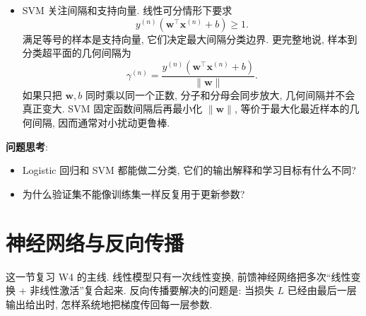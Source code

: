 \documentclass{../nndlcourse}
\begin{document}
\begin{enumerate}
\begin{itemize}
        因而更新会把该样本朝正确一侧推.
        \item SVM 关注间隔和支持向量. 线性可分情形下要求
        \[
            y^{(n)}\left(\boldsymbol{w}^{\top}\boldsymbol{x}^{(n)}+b\right)\ge 1.
        \]
        满足等号的样本是支持向量, 它们决定最大间隔分类边界.
        更完整地说, 样本到分类超平面的几何间隔为
        \[
            \gamma^{(n)}
            =
            \frac{y^{(n)}\left(\boldsymbol{w}^{\top}\boldsymbol{x}^{(n)}+b\right)}
            {\|\boldsymbol{w}\|}.
        \]
        如果只把 $\boldsymbol{w},b$ 同时乘以同一个正数, 分子和分母会同步放大, 几何间隔并不会真正变大. SVM 固定函数间隔后再最小化 $\|\boldsymbol{w}\|$, 等价于最大化最近样本的几何间隔, 因而通常对小扰动更鲁棒.
    \end{itemize}
\end{enumerate}

\textbf{问题思考}:
\begin{itemize}
    \item Logistic 回归和 SVM 都能做二分类, 它们的输出解释和学习目标有什么不同?
    \item 为什么验证集不能像训练集一样反复用于更新参数?
\end{itemize}

\section{神经网络与反向传播}

这一节复习 W4 的主线. 线性模型只有一次线性变换, 前馈神经网络把多次“线性变换 + 非线性激活”复合起来. 反向传播要解决的问题是: 当损失 $L$ 已经由最后一层输出给出时, 怎样系统地把梯度传回每一层参数.
\end{document}
